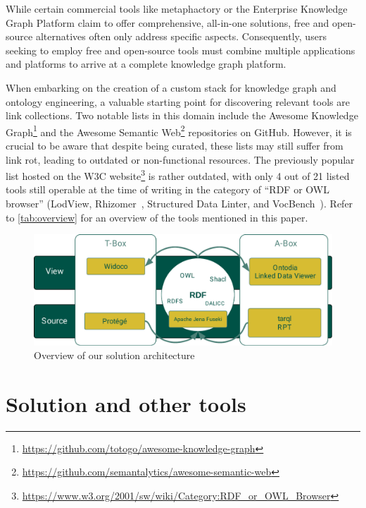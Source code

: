 \documentclass[
hf
]{ceurart}
\begin{document}
While certain commercial tools like metaphactory or the Enterprise Knowledge Graph Platform claim to offer comprehensive, all-in-one solutions, free and open-source alternatives often only address specific aspects. Consequently, users seeking to employ free and open-source tools must combine multiple applications and platforms to arrive at a complete knowledge graph platform. 

When embarking on the creation of a custom stack for knowledge graph and ontology engineering, a valuable starting point for discovering relevant tools are link collections. Two notable lists in this domain include the Awesome Knowledge Graph\footnote{\url{https://github.com/totogo/awesome-knowledge-graph}} and the Awesome Semantic Web\footnote{\url{https://github.com/semantalytics/awesome-semantic-web}} repositories on GitHub. However, it is crucial to be aware that despite being curated, these lists may still suffer from link rot, leading to outdated or non-functional resources.
%
The previously popular list hosted on the W3C website\footnote{\url{https://www.w3.org/2001/sw/wiki/Category:RDF_or_OWL_Browser}} is rather outdated, with only 4 out of 21 listed tools still operable at the time of writing in the category of ``RDF or OWL browser''  (LodView, Rhizomer~\cite{garcia2022rhizomer}, Structured Data Linter, and VocBench~\cite{stellato2020vocbench}).
%
Refer to \autoref{tab:overview} for an overview of the tools mentioned in this paper.

\begin{figure}
    \centering
    \includegraphics[width=.9\textwidth]{overview_coy_rdf.pdf}
    \caption{Overview of our solution architecture}
    \label{fig:architecture}
\end{figure}

\section{Solution and other tools}
\end{document}

